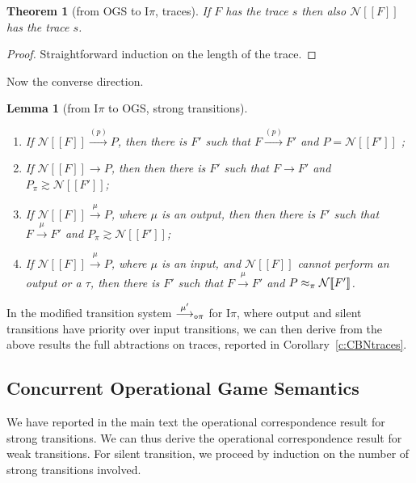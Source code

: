 \documentclass[11pt,a4paper]{amsart}
\theoremstyle{plain}
\theoremstyle{definition}
\theoremstyle{defC}
\theoremstyle{thmC}
\theoremstyle{plain}
\numberwithin{equation}{section}
\newcommand{\wb}{\bsim}
\newcommand{\bsim}{\wbPI} %
\def\finish#1{\vskip.2cm\noindent{\em #1}%
  \marginpar{$\longleftarrow$}\vskip.2cm}
\newcommand{\finish}[1]{}
\newcommand{\rmm}[1]{{\tt{\lowercase{#1}}}}
\newcommand{\genarr}[2]{\mathrel{\stackrel{{#1}}{\longrightarrow}_{\rmm{\lowercase{#2}}}}}
\newcommand{\arrN}[1]{\genarr{#1}{o\pi}}  %
\newcommand{\arr}[1]{\mathrel{\stackrel{{#1}}{\longrightarrow}}}  %
\newcommand{\genwb}[1]{\mathrel{\approx_{\rmm{\lowercase{#1}}}}}       %
\newcommand{\wbPI}{\genwb{\pi}}       %
\newcommand{\contr}{\mathrel{\mbox{}_{\pi}\!\!\gtrsim}}
\newcommand{\encoN}[1]{{\mathcal {N}} [\! [ #1 ] \! ]  }
\newcommand{\Intp}{\mbox{I$\pi$}\xspace}   %
\newcommand{\piI}{\Intp}   %
\newcommand{\initName}{}
\theoremstyle{plain}
\newtheorem{theorem}[thm]{Theorem}
\newtheorem{lemma}[thm]{Lemma}
\theoremstyle{definition}
\begin{document}


\begin{theorem}[from OGS to \piI, traces]
\label{t:tracesGSpi_cbn}
If $F$  has the trace $s$ then also $ \encoN F$ has the trace $s$.
\end{theorem} 

\begin{proof}
Straightforward induction on the length of the trace. 
\end{proof} 
\noindent
Now the converse direction. 


\begin{lemma}[from \piI to OGS, strong transitions]
\label{l:opcorr_cbnshort_piI}
$ $ \begin{enumerate}

\item   
If $\encoN{F } \arr  {\initName (p)}  
P$, 
then there is $F'$ such that 
 $F \arr{\initName (p)} F'$
 and
 $P = 
 \encoN{F'}$ ; 

\item  If 
$ \encoN F \longrightarrow P$, then 
then there is $F'$ such that 
$F \longrightarrow F'$ and  
$ P  \contr \encoN {F'}$; 

\item  If
$ \encoN F \arr{\mu} P$, 
where $\mu$ is an output,
 then 
then there is $F'$ such that 
$  F \arr{\mu} F' $ and 
$P  \contr  \encoN  {F'}$; 

\item  If
$ \encoN F \arr{\mu} P$, 
where $\mu$ is an input,  and 
$ \encoN F$ cannot  perform an output or a $\tau$,  
then there is $F'$ such that 
$  F \arr{\mu} F' $ and 
$P  \wb  \encoN  {F'}$. 
\end{enumerate}
\end{lemma} 
\noindent
In the modified transition system $\arrN {\mu'}$  for \piI, where output and silent transitions have
priority over input transitions, we can then derive from the above results the  full
abtractions on traces, reported in Corollary~\ref{c:CBNtraces}. 

\subsection{Concurrent Operational Game Semantics}


We have reported in the main text the operational correspondence result for strong
transitions. We can thus derive the 
operational correspondence result for weak
transitions.
 For silent transition, we proceed by
induction on the number of strong transitions involved. 
\end{document}
